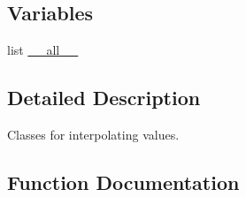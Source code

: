 \subsection*{Variables}
\begin{DoxyCompactItemize}
\item 
list \hyperlink{namespacescipy_1_1interpolate_1_1interpolate_a94c701f1e486488916eaeabb6dc5fe72}{\+\_\+\+\_\+all\+\_\+\+\_\+}
\end{DoxyCompactItemize}


\subsection{Detailed Description}
\begin{DoxyVerb}Classes for interpolating values.
\end{DoxyVerb}
 

\subsection{Function Documentation}
\hypertarget{namespacescipy_1_1interpolate_1_1interpolate_ae6ebd1c2cdc35a4a9fa4982e87627859}{}
